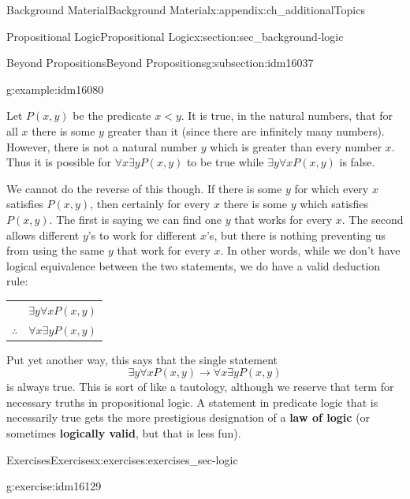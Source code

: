 \documentclass[oneside,10pt,]{book}
\newcommand{\terminology}[1]{\textbf{#1}}
\numberwithin{equation}{chapter}
\newcommand{\hrulethin}  {\noalign{\hrule height 0.04em}}
\def\imp{\rightarrow}
\newcommand{\lt}{<}
\begin{document}
\begin{appendixptx}{Background Material}{}{Background Material}{}{}{x:appendix:ch_additionalTopics}
\begin{sectionptx}{Propositional Logic}{}{Propositional Logic}{}{}{x:section:sec_background-logic}
\begin{subsectionptx}{Beyond Propositions}{}{Beyond Propositions}{}{}{g:subsection:idm16037}
\begin{example}{}{g:example:idm16080}
\par
Let \(P(x,y)\) be the predicate \(x \lt  y\). It is true, in the natural numbers, that for all \(x\) there is some \(y\) greater than it (since there are infinitely many numbers). However, there is not a natural number \(y\) which is greater than every number \(x\).  Thus it is possible for \(\forall x \exists y P(x,y)\) to be true while \(\exists y \forall x P(x,y)\) is false.%
\par
We cannot do the reverse of this though. If there is some \(y\) for which every \(x\) satisfies \(P(x,y)\), then certainly for every \(x\) there is some \(y\) which satisfies \(P(x,y)\). The first is saying we can find one \(y\) that works for every \(x\). The second allows different \(y\)'s to work for different \(x\)'s, but there is nothing preventing us from using the same \(y\) that work for every \(x\).  In other words, while we don't have logical equivalence between the two statements, we do have a valid deduction rule:%
\begin{sidebyside}{1}{0}{0}{0}%
\begin{sbspanel}{1}%
{\centering%
\begin{tabular}{cc}
&\(\exists y \forall x P(x,y)\)\tabularnewline\hrulethin
\(\therefore\)&\(\forall x \exists y P(x,y)\)
\end{tabular}
\par}
\end{sbspanel}%
\end{sidebyside}%
\par
Put yet another way, this says that the single statement%
\begin{equation*}
\exists y \forall x P(x,y) \imp \forall x \exists y P(x,y)
\end{equation*}
is always true.  This is sort of like a tautology, although we reserve that term for necessary truths in propositional logic.  A statement in predicate logic that is necessarily true gets the more prestigious designation of a \terminology{law of logic} (or sometimes \terminology{logically valid}, but that is less fun).%
\end{example}
\end{subsectionptx}
%
%
\typeout{************************************************}
\typeout{************************************************}
%
\begin{exercises-subsection}{Exercises}{}{Exercises}{}{}{x:exercises:exercises_sec-logic}
\begin{divisionexercise}{1}{}{}{g:exercise:idm16129}%

\end{divisionexercise}
\end{exercises-subsection}
\end{sectionptx}
\end{appendixptx}
\end{document}
